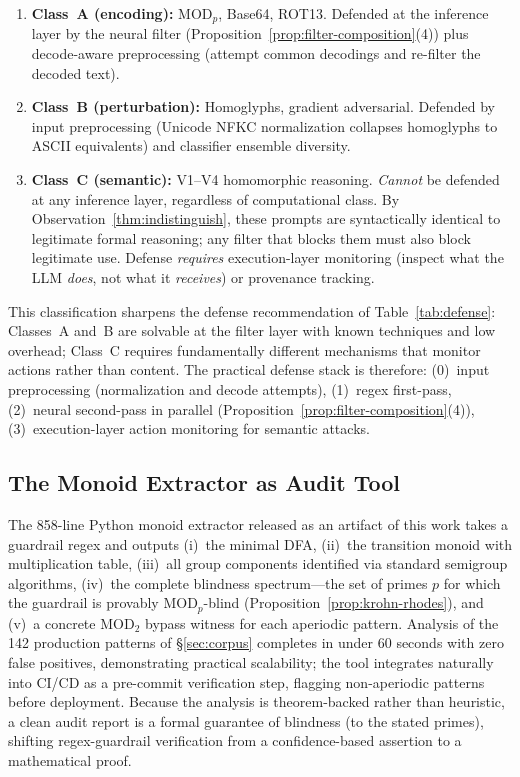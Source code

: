 \documentclass[letterpaper,twocolumn,10pt]{article}
\theoremstyle{definition}
\theoremstyle{remark}
\begin{document}
\begin{enumerate}
\item \textbf{Class~A (encoding):} $\mathrm{MOD}_p$, Base64, ROT13.
  Defended at the inference layer by the neural filter
  (Proposition~\ref{prop:filter-composition}(4)) plus decode-aware preprocessing
  (attempt common decodings and re-filter the decoded text).

\item \textbf{Class~B (perturbation):} Homoglyphs, gradient adversarial.
  Defended by input preprocessing (Unicode NFKC normalization collapses
  homoglyphs to ASCII equivalents) and classifier ensemble diversity.

\item \textbf{Class~C (semantic):} V1--V4 homomorphic reasoning.
  \emph{Cannot} be defended at any inference layer, regardless of computational
  class.
  By Observation~\ref{thm:indistinguish}, these prompts are syntactically
  identical to legitimate formal reasoning; any filter that blocks them must
  also block legitimate use.
  Defense \emph{requires} execution-layer monitoring (inspect what the LLM
  \emph{does}, not what it \emph{receives}) or provenance tracking.
\end{enumerate}

This classification sharpens the defense recommendation of Table~\ref{tab:defense}:
Classes~A and~B are solvable at the filter layer with known techniques and low
overhead; Class~C requires fundamentally different mechanisms that monitor
actions rather than content.
The practical defense stack is therefore: (0)~input preprocessing (normalization
and decode attempts), (1)~regex first-pass, (2)~neural second-pass in parallel
(Proposition~\ref{prop:filter-composition}(4)), (3)~execution-layer action
monitoring for semantic attacks.

\subsection{The Monoid Extractor as Audit Tool}\label{sec:monoid-extractor}

The 858-line Python monoid extractor released as an artifact of this
work takes a guardrail regex and outputs (i)~the minimal DFA, (ii)~the
transition monoid with multiplication table, (iii)~all group components
identified via standard semigroup algorithms, (iv)~the complete
blindness spectrum---the set of primes $p$ for which the guardrail is
provably $\mathrm{MOD}_p$-blind (Proposition~\ref{prop:krohn-rhodes}),
and (v)~a concrete $\mathrm{MOD}_2$ bypass witness for each aperiodic
pattern.
Analysis of the 142 production patterns of \S\ref{sec:corpus} completes
in under 60 seconds with zero false positives, demonstrating practical
scalability; the tool integrates naturally into CI/CD as a pre-commit
verification step, flagging non-aperiodic patterns before deployment.
Because the analysis is theorem-backed rather than heuristic, a clean
audit report is a formal guarantee of blindness (to the stated primes),
shifting regex-guardrail verification from a confidence-based assertion
to a mathematical proof.
\end{document}
